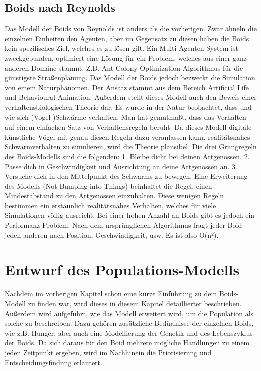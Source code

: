 \documentclass[draft=false
              ,paper=a4
              ,twoside=false
              ,fontsize=11pt
              ,headsepline
              ,BCOR10mm
              ,DIV11
              ,bibtotoc
              ,liststotoc
              ]{scrbook}
\begin{document}
\section{Boids nach Reynolds}
Das Modell der Boids von Reynolds ist anders als die vorherigen. Zwar ähneln die einzelnen Einheiten den Agenten, aber im Gegensatz zu diesen haben die Boids kein spezifisches Ziel, welches es zu lösen gilt. Ein Multi-Agenten-System ist zweckgebunden, optimiert eine Lösung für ein Problem, welches aus einer ganz anderen Domäne stammt. Z.B. Ant Colony Optimization Algorithmus für die günstigste Straßenplanung. 
Das Modell der Boids jedoch bezweckt die Simulation von einem Naturphänomen. Der Ansatz stammt aus dem Bereich Artificial Life und Behavioural Animation. 
Außerdem stellt dieses Modell auch den Beweis einer verhaltensbiologischen Theorie dar: Es wurde in der Natur beobachtet, dass und wie sich (Vogel-)Schwärme verhalten. Man hat gemutmaßt, dass das Verhalten auf einem einfachen Satz von Verhaltensregeln beruht. Da dieses Modell digitale künstliche Vögel mit genau diesen Regeln dazu veranlassen kann, realitätsnahes Schwarmverhalten zu simulieren, wird die Theorie plausibel.
Die drei Grungregeln des Boids-Modells sind die folgenden:
1. Bleibe dicht bei deinen Artgenossen.
2. Passe dich in Geschwindigkeit und Ausrichtung an deine Artgenossen an.
3. Versuche dich in den Mittelpunkt des Schwarms zu bewegen.
Eine Erweiterung des Modells (Not Bumping into Things) beinhaltet die Regel, einen Mindestabstand zu den Artgenossen einzuhalten.
Diese wenigen Regeln bestimmen ein erstaunlich realitätsnahes Verhalten, welches für viele Simulationen völlig ausreicht.
Bei einer hohen Anzahl an Boids gibt es jedoch ein Performanz-Problem: Nach dem ursprünglichen Algorithmus fragt jeder Boid jeden anderen nach Position, Geschwindigkeit, usw. Es ist also O(n²). 

\chapter{Entwurf des Populations-Modells}\label{modell}
Nachdem im vorherigen Kapitel schon eine kurze Einführung zu dem Boids-Modell zu finden war, wird dieses in diesem Kapitel detaillierter beschrieben. Außerdem wird aufgeführt, wie das Modell erweitert wird, um die Population als solche zu beschreiben. Dazu gehören zusätzliche Bedürfnisse der einzelnen Boids, wie z.B. Hunger, aber auch eine Modellierung der Genetik und des Lebenszyklus der Boids. Da sich daraus für den Boid mehrere mögliche Handlungen zu einem jeden Zeitpunkt ergeben, wird im Nachhinein die Priorisierung und Entscheidungsfindung erläutert.
\end{document}
